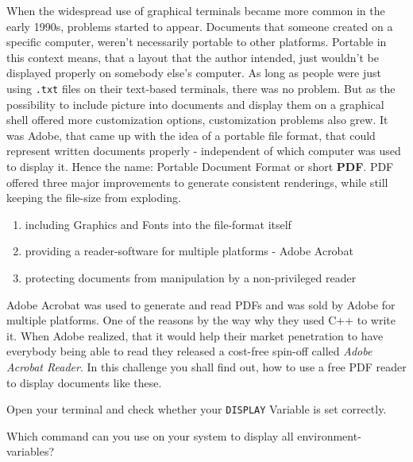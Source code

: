 \begin{challenge}
    \begin{chadescription}
    When the widespread use of graphical terminals became more common in the early 1990s, problems started to appear. Documents that someone created on a specific computer, weren't necessarily portable to other platforms. Portable in this context means, that a layout that the author intended, just wouldn't be displayed properly on somebody else's computer. As long as people were just using \texttt{.txt} files on their text-based terminals, there was no problem. But as the possibility to include picture into documents and display them on a graphical shell offered more customization options, customization problems also grew. It was Adobe, that came up with the idea of a portable file format, that could represent written documents properly - independent of which computer was used to display it. Hence the name: Portable Document Format or short \textbf{PDF}. PDF offered three major improvements to generate consistent renderings, while still keeping the file-size from exploding.
    \begin{enumerate}
        \item including Graphics and Fonts into the file-format itself
        \item providing a reader-software for multiple platforms - Adobe Acrobat
        \item protecting documents from manipulation by a non-privileged reader
    \end{enumerate}
    Adobe Acrobat was used to generate and read PDFs and was sold by Adobe for multiple platforms. One of the reasons by the way why they used C++ to write it. When Adobe realized, that it would help their market penetration to have everybody being able to read they released a cost-free spin-off called \textit{Adobe Acrobat Reader}. In this challenge you shall find out, how to use a free PDF reader to display documents like these.
    \end{chadescription}
    \begin{task}
    Open your terminal and check whether your \texttt{DISPLAY} Variable is set correctly.
    \begin{questions}
        \item Which command can you use on your system to display all environment-variables?

\end{questions}
\end{task}
\end{challenge}
